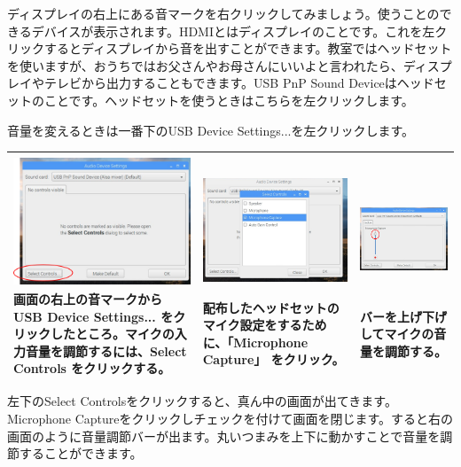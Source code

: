 \documentclass[a4paper,dvipdfmx]{jarticle}
\begin{document}
{
ディスプレイの右上にある音マークを右クリックしてみましょう。使うことのできるデバイスが表示されます。HDMIとはディスプレイのことです。これを左クリックするとディスプレイから音を出すことができます。教室ではヘッドセットを使いますが、おうちではお父さんやお母さんにいいよと言われたら、ディスプレイやテレビから出力することもできます。USB
PnP Sound
Deviceはヘッドセットのことです。ヘッドセットを使うときはこちらを左クリックします。}

{
音量を変えるときは一番下のUSB Device
Settings...を左クリックします。}

\begin{center}
\tablefirsthead{}
\tablehead{}
\tabletail{}
\tablelasttail{}
\begin{supertabular}{|l|l|l|}
\hline
{
\includegraphics[width=5.475cm,height=3.907cm]{text06-img/text06-img006.png} \newline
画面の右上の音マークから USB Device Settings...
をクリックしたところ。マイクの入力音量を調節するには、Select
Controls をクリックする。}
 &
{
		\includegraphics[width=5.475cm,height=3.907cm]{text06-img/text06-img007.png} \newline
配布したヘッドセットのマイク設定をするために、「Microphone
Capture」 をクリック。}

 & %
{
\includegraphics[width=5.475cm,height=3.928cm]{text06-img/text06-img008.png} \newline
バーを上げ下げしてマイクの音量を調節する。}
\label{seq:refIllustration8}
\\\hline
\end{supertabular}
\end{center}
{
左下のSelect
Controlsをクリックすると、真ん中の画面が出てきます。Microphone
Captureをクリックしチェックを付けて画面を閉じます。すると右の画面のように音量調節バーが出ます。丸いつまみを上下に動かすことで音量を調節することができます。}
\end{document}
